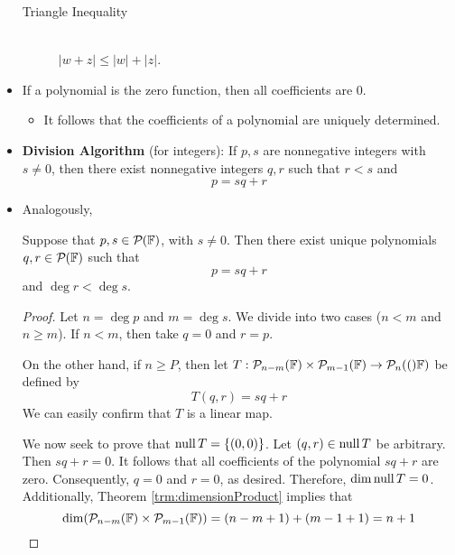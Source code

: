 \documentclass[../main.tex]{subfiles}
\begin{document}
\begin{itemize}
\begin{theorem}
\begin{description}
            \item[Triangle Inequality]\hfill\\ $|w+z|\leq|w|+|z|$.
        \end{description}
    \end{theorem}
    \item If a polynomial is the zero function, then all coefficients are 0.
    \begin{itemize}
        \item It follows that the coefficients of a polynomial are uniquely determined.
    \end{itemize}
    \item \textbf{Division Algorithm} (for integers): If $p,s$ are nonnegative integers with $s\neq 0$, then there exist nonnegative integers $q,r$ such that $r<s$ and
    \begin{equation*}
        p = sq+r
    \end{equation*}
    \item Analogously,
    \begin{theorem}\label{trm:DivisionAlgorithmforPolynomials}
        Suppose that $p,s\in\pol{\F}$, with $s\neq 0$. Then there exist unique polynomials $q,r\in\pol{\F}$ such that
        \begin{equation*}
            p = sq+r
        \end{equation*}
        and $\deg r<\deg s$.
        \begin{proof}
            Let $n=\deg p$ and $m=\deg s$. We divide into two cases ($n<m$ and $n\geq m$). If $n<m$, then take $q=0$ and $r=p$.\par\smallskip
            On the other hand, if $n\geq P$, then let $T:\pol[n-m]{\F}\times\pol[m-1]{\F}\to\pol[n](\F)$ be defined by
            \begin{equation*}
                T(q,r) = sq+r
            \end{equation*}
            We can easily confirm that $T$ is a linear map.\par
            We now seek to prove that $\nul T=\{(0,0)\}$. Let $(q,r)\in\nul T$ be arbitrary. Then $sq+r=0$. It follows that all coefficients of the polynomial $sq+r$ are zero. Consequently, $q=0$ and $r=0$, as desired. Therefore, $\dim\nul T=0$. Additionally, Theorem \ref{trm:dimensionProduct} implies that
            \begin{equation*}
                \dim(\pol[n-m]{\F}\times\pol[m-1]{\F}) = (n-m+1)+(m-1+1) = n+1
            \end{equation*}

\end{proof}
\end{theorem}
\end{itemize}
\end{document}
